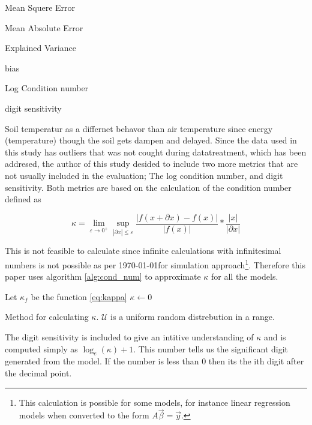 \begin{itemize*}
	\item Mean Squere Error
	\item Mean Absolute Error
	\item Explained Variance
	\item bias
	\item Log Condition number
	\item digit sensitivity
\end{itemize*}

Soil temperatur as a differnet behavor than air temperature since energy (temperature) though the soil gets dampen and delayed. Since the data used in this study has outliers that was not cought during datatreatment, which has been addresed, the author of this study desided to include two more metrics that are not usually included in the evaluation; The log condition number, and digit sensitivity. Both metrics are based on the calculation of the condition number defined as 

\begin{equation}\label{eq:kappa}
\kappa = \lim\limits_{\varepsilon \to 0^+} \sup\limits_{|\partial x|\leq\varepsilon}  \frac{\left|f(x+\partial x) - f(x)\right|}{|f(x)|}*\frac{|x|}{|\partial x|} 
\end{equation}

This is not feasible to calculate since infinite calculations with infinitesimal numbers is not possible as per \today for simulation approach\footnote{This calculation is possible for some models, for instance linear regression models when converted to the form $A\vec{\beta} = \vec{y}$.}. Therefore this paper uses algorithm \ref{alg:cond_num} to approximate $\kappa$ for all the models.

\begin{algorithm}[H]
	\SetAlgoLined
	Let $\kappa_f$ be the function \ref{eq:kappa}\;
	$\kappa\gets 0$\;
	\Return{$\kappa$}
	\caption[Randommised $\kappa$ algorithm]{Method for calculating $\kappa$. $\mathcal{U}$ is a uniform random distrebution in a range.}
	\label{alg:cond_num}
\end{algorithm}

The digit sensitivity is included to give an intitive understanding of $\kappa$ and is computed simply as $\log_e(\kappa)+1$. This number tells us the significant digit generated from the model. If the number is less than 0 then its the ith digit after the decimal point.


